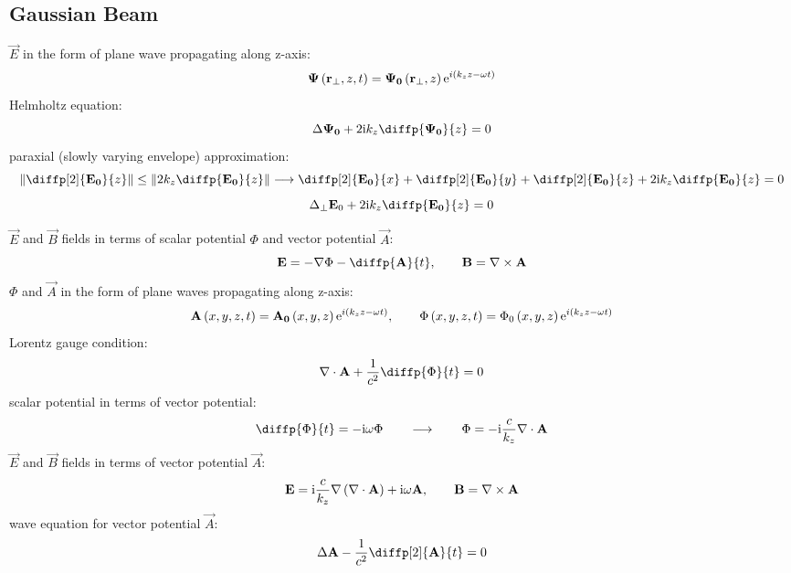 \subsection{Gaussian Beam}
$ \vec{E} $ in the form of plane wave propagating along z-axis:
\begin{equation*}
\mathbf{\Psi}\left(\mathbf{r}_{\bot}, z, t\right)  = \mathbf{\Psi_0}\left(\mathbf{r}_{\bot}, z\right) \mathrm{e}^{i(k_z z - \omega t)}
\end{equation*}
Helmholtz equation:
\begin{equation*}
\laplace{\vec{\Psi_0}} + 2 \i k_z \diffp{\vec{\Psi_0}}{z} = 0
\end{equation*}
paraxial (slowly varying envelope) approximation:
\begin{equation*}
\left\| \diffp[2]{\vec{E_0}}{z}\right\|  \leq \left\|2 k_z \diffp{\vec{E_0}}{z}\right\|  \longrightarrow 
\diffp[2]{\vec{E_0}}{x} + \diffp[2]{\vec{E_0}}{y} + \diffp[2]{\vec{E_0}}{z} + 2 \i k_z \diffp{\vec{E_0}}{z} = 0
\end{equation*}
\begin{equation*}
\laplace_{\bot}{\vec{E}_0} + 2 \i k_z \diffp{\vec{E_0}}{z} = 0
\end{equation*}

$ \vec{E} $ and $ \vec{B} $ fields in terms of scalar potential $ \Phi $ and vector potential $ \vec{A} $:
\begin{equation*}
	\vec{E} = - \grad{\Phi} - \diffp{\vec{A}}{t}, \qquad \vec{B} = \rot{\vec{A}}
\end{equation*}
$ \Phi $ and $ \vec{A} $ in the form of plane waves propagating along z-axis:
\begin{equation*}
	\mathbf{A}\left(x, y, z, t\right)  = \mathbf{A_0}\left( x, y, z\right) \mathrm{e}^{i(k_z z - \omega t)}, \qquad \Phi\left(x, y, z, t \right) = \Phi_0\left(x, y, z\right) \mathrm{e}^{i(k_z z - \omega t)}
\end{equation*}
Lorentz gauge condition:
\begin{equation*}
	\div{\vec{A}} + \frac{1}{c^2} \diffp{\Phi}{t} = 0
\end{equation*}
scalar potential in terms of vector potential:
\begin{equation*}
	\diffp{\Phi}{t} = - \i \omega \Phi \qquad \longrightarrow \qquad \Phi = - \i \frac{c}{k_z} \div{\vec{A}} 
\end{equation*}
$ \vec{E} $ and $ \vec{B} $ fields in terms of vector potential $ \vec{A} $:
\begin{equation*}
	\mathbf{E} = \mathrm{i} \frac{c}{k_z} \nabla \left(\nabla \cdot \mathbf{A}\right) + \mathrm{i} \omega \mathbf{A}, \qquad \mathbf{B} = \nabla \times \mathbf{A}
\end{equation*}
wave equation for vector potential $ \vec{A} $:
\begin{equation*}
\laplace{\vec{A}} - \frac{1}{c^2}\diffp[2]{\vec{A}}{t} = 0
\end{equation*}


